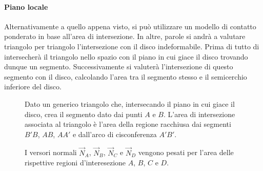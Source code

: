 \paragraph{Piano locale}
Alternativamente a quello appena visto, si può utilizzare un modello di contatto ponderato in base all'area di intersezione. In altre, parole si andrà a valutare triangolo per triangolo l'intersezione con il disco indeformabile. Prima di tutto di intersecherà il triangolo nello spazio con il piano in cui giace il disco trovando dunque un segmento. Successivamente si valuterà l'intersezione di questo segmento con il disco, calcolando l'area tra il segmento stesso e il semicerchio inferiore del disco.

\begin{figure}
	\centering
	\caption{Dato un generico triangolo che, intersecando il piano in cui giace il disco, crea il segmento dato dai punti $A$ e $B$. L'area di intersezione associata al triangolo è l'area della regione racchiusa dai segmenti $B'B$, $AB$, $AA'$ e dall'arco di cisconferenza $A'B'$.}
\end{figure}
\begin{figure}
	\centering
	\caption{I versori normali $\vec{N}_A$, $\vec{N}_B$, $\vec{N}_C$ e $\vec{N}_D$ vengono pesati per l'area delle rispettive regioni d'interesezione $A$, $B$, $C$ e $D$.}
\end{figure}

